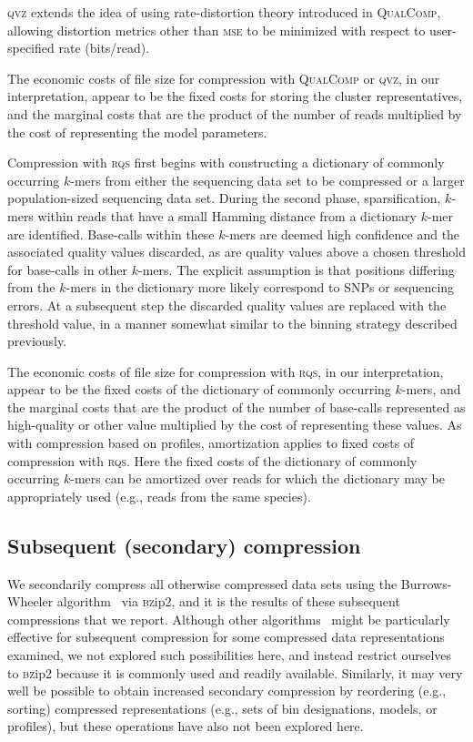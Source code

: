 \documentclass{bmcart}
\begin{document}
\textsc{qvz} extends the idea of using rate-distortion theory
introduced in \textsc{QualComp}, allowing distortion metrics other
than \textsc{mse} to be minimized with respect to user-specified rate
(bits/read).

The economic costs of file size for compression with \textsc{QualComp}
or \textsc{qvz}, in our interpretation, appear to be the fixed costs
for storing the cluster representatives, and the marginal costs that
are the product of the number of reads multiplied by the cost of
representing the model parameters.

Compression with \textsc{rqs} first begins with constructing a
dictionary of commonly occurring $k$-mers from either the sequencing
data set to be compressed or a larger population-sized sequencing
data set. During the second phase, sparsification, $k$-mers within
reads that have a small Hamming distance from a dictionary $k$-mer are
identified. Base-calls within these $k$-mers are deemed high
confidence and the associated quality values discarded, as are quality
values above a chosen threshold for base-calls in other $k$-mers. The
explicit assumption is that positions differing from the $k$-mers in
the dictionary more likely correspond to SNPs or sequencing errors. At
a subsequent step the discarded quality values are replaced with the
threshold value, in a manner somewhat similar to the binning strategy
described previously.

The economic costs of file size for compression with \textsc{rqs}, in
our interpretation, appear to be the fixed costs of the dictionary of
commonly occurring $k$-mers, and the marginal costs that are the
product of the number of base-calls represented as high-quality or
other value multiplied by the cost of representing these values. As
with compression based on profiles, amortization applies to fixed
costs of compression with \textsc{rqs}. Here the fixed costs of the
dictionary of commonly occurring $k$-mers can be amortized over reads
for which the dictionary may be appropriately used (e.g., reads from
the same species).

\subsection*{Subsequent (secondary) compression}

We secondarily compress all otherwise compressed data sets using the
Burrows-Wheeler algorithm~\cite{bwt} via \textsc{bz}ip2, and it is the
results of these subsequent compressions that we report. Although
other algorithms~\cite[e.g.,][]{HUFFMAN:1952nr,Ziv77auniversal,
  DBLP:journals/tit/ZivL78} might be particularly effective for
subsequent compression for some compressed data representations
examined, we not explored such possibilities here, and instead
restrict ourselves to \textsc{bz}ip2 because it is commonly used and
readily available. Similarly, it may very well be possible to obtain
increased secondary compression by reordering (e.g., sorting)
compressed representations (e.g., sets of bin designations, models, or
profiles), but these operations have also not been explored here.
\end{document}
